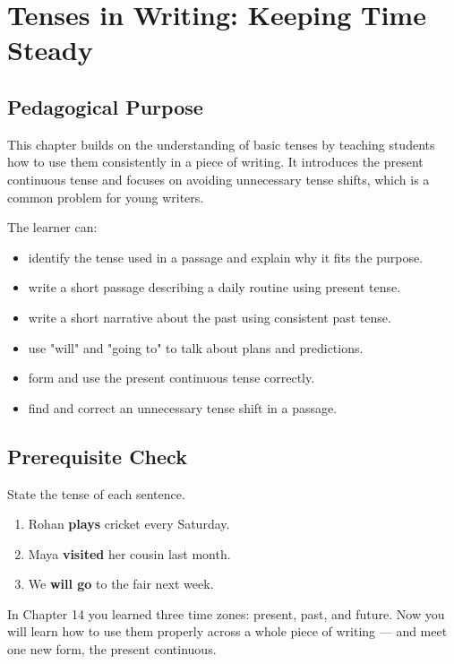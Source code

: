 
\chapter{Tenses in Writing: Keeping Time Steady}

\section{Pedagogical Purpose}
This chapter builds on the understanding of basic tenses by teaching students how to use them consistently in a piece of writing. It introduces the present continuous tense and focuses on avoiding unnecessary tense shifts, which is a common problem for young writers.

\begin{learningobjectives}
The learner can:
\begin{itemize}
    \item identify the tense used in a passage and explain why it fits the purpose.
    \item write a short passage describing a daily routine using present tense.
    \item write a short narrative about the past using consistent past tense.
    \item use "will" and "going to" to talk about plans and predictions.
    \item form and use the present continuous tense correctly.
    \item find and correct an unnecessary tense shift in a passage.
\end{itemize}
\end{learningobjectives}

\section{Prerequisite Check}
\begin{quickcheck}
State the tense of each sentence.
\begin{enumerate}
    \item Rohan \textbf{plays} cricket every Saturday.
    \item Maya \textbf{visited} her cousin last month.
    \item We \textbf{will go} to the fair next week.
\end{enumerate}
\end{quickcheck}

\begin{rememberbox}
In Chapter 14 you learned three time zones: present, past, and future. Now you will learn how to use them properly across a whole piece of writing — and meet one new form, the present continuous.
\end{rememberbox}

